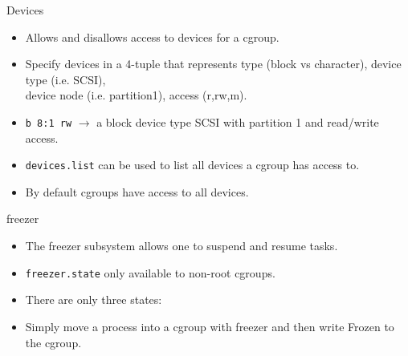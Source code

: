 \documentclass[pdf]{beamer}
\begin{document}
\begin{frame}{Devices}
\begin{itemize}
\item Allows and disallows access to devices for a cgroup.
\item Specify devices in a 4-tuple that represents type (block vs character), device type (i.e. SCSI), \\ device node (i.e. partition1), access (r,rw,m).
\item \texttt{b 8:1 rw} $\rightarrow$  a block device type SCSI with partition 1 and read/write access.
\item \texttt{devices.list} can be used to list all devices a cgroup has access to.
\item By default cgroups have access to all devices.
\end{itemize}
\end{frame}


\begin{frame}{freezer}
\begin{itemize}
\item The freezer subsystem allows one to suspend and resume tasks.
\item \texttt{freezer.state} only available to non-root cgroups.
\item There are only three states:
\item Simply move a process into a cgroup with freezer and then write Frozen to the cgroup. 
\end{itemize}
\end{frame}
\end{document}
